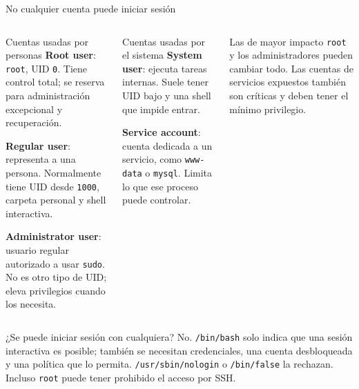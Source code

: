 \documentclass[aspectratio=169,10pt,c]{beamer}
\begin{document}
\begin{frame}{No cualquier cuenta puede iniciar sesión}
\begin{columns}[T,onlytextwidth]
\begin{exampleblock}{Cuentas usadas por personas}
\footnotesize
\textbf{Root user}: \texttt{root}, UID \texttt{0}. Tiene control total; se reserva para administración excepcional y recuperación.\par\smallskip
\textbf{Regular user}: representa a una persona. Normalmente tiene UID desde \texttt{1000}, carpeta personal y shell interactiva.\par\smallskip
\textbf{Administrator user}: usuario regular autorizado a usar \texttt{sudo}. No es otro tipo de UID; eleva privilegios cuando los necesita.
\end{exampleblock}
\begin{exampleblock}{Cuentas usadas por el sistema}
\footnotesize
\textbf{System user}: ejecuta tareas internas. Suele tener UID bajo y una shell que impide entrar.\par\smallskip
\textbf{Service account}: cuenta dedicada a un servicio, como \texttt{www-data} o \texttt{mysql}. Limita lo que ese proceso puede controlar.
\end{exampleblock}
\begin{block}{Las de mayor impacto}
\footnotesize \texttt{root} y los administradores pueden cambiar todo. Las cuentas de servicios expuestos también son críticas y deben tener el mínimo privilegio.
\end{block}
\end{columns}
\begin{alertblock}{¿Se puede iniciar sesión con cualquiera?}
\footnotesize No. \texttt{/bin/bash} solo indica que una sesión interactiva es posible; también se necesitan credenciales, una cuenta desbloqueada y una política que lo permita. \texttt{/usr/sbin/nologin} o \texttt{/bin/false} la rechazan. Incluso \texttt{root} puede tener prohibido el acceso por SSH.
\end{alertblock}
\end{frame}
\end{document}
